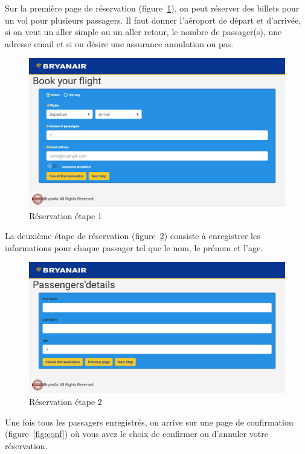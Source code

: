 \documentclass[12pt,a4paper]{article}
\begin{document}
		Sur la première page de réservation (figure~\ref{fig:res1}), on peut réserver des billets pour un vol pour plusieurs passagers. Il faut donner l'aéroport de départ et d'arrivée, si on veut un aller simple ou un aller retour, le nombre de passager(s), une adresse email et si on désire une assurance annulation ou pas.
		\begin{figure}
      \includegraphics[width=\textwidth]{Reservation.png}
			\caption{Réservation étape 1}
			\label{fig:res1}
		\end{figure}

		La deuxième étape de réservation (figure~\ref{fig:res2}) consiste à enregistrer les informations pour chaque passager tel que le nom, le prénom et l'age.
		\begin{figure}
      \includegraphics[width=\textwidth]{Detail.png}
			\caption{Réservation étape 2}
			\label{fig:res2}
		\end{figure}

		Une fois tous les passagers enregistrés, on arrive sur une page de confirmation (figure~\ref{fig:conf}) où vous avez le choix de confirmer ou d'annuler votre réservation.
\end{document}
